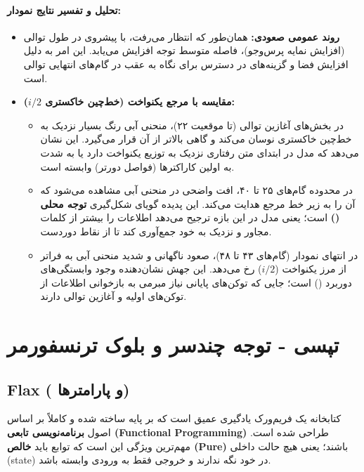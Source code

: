 \documentclass{article}
\begin{document}
\paragraph{تحلیل و تفسیر نتایج نمودار:}
\begin{itemize}
	\item \textbf{روند عمومی صعودی:} همان‌طور که انتظار می‌رفت، با پیشروی در طول توالی (افزایش نمایه پرس‌وجو)، فاصله متوسط توجه افزایش می‌یابد. این امر به دلیل افزایش فضا و گزینه‌های در دسترس برای نگاه به عقب در گام‌های انتهایی توالی است.
	\item \textbf{مقایسه با مرجع یکنواخت (خط‌چین خاکستری $i/2$):}
	\begin{itemize}
		\item در بخش‌های آغازین توالی (تا موقعیت ۲۲)، منحنی آبی رنگ بسیار نزدیک به خط‌چین خاکستری نوسان می‌کند و گاهی بالاتر از آن قرار می‌گیرد. این نشان می‌دهد که مدل در ابتدای متن رفتاری نزدیک به توزیع یکنواخت دارد یا به شدت به اولین کاراکترها (فواصل دورتر) وابسته است.
		\item در محدوده گام‌های ۲۵ تا ۴۰، افت واضحی در منحنی آبی مشاهده می‌شود که آن را به زیر خط مرجع هدایت می‌کند. این پدیده گویای شکل‌گیری \textbf{توجه محلی ()} است؛ یعنی مدل در این بازه ترجیح می‌دهد اطلاعات را بیشتر از کلمات مجاور و نزدیک به خود جمع‌آوری کند تا از نقاط دوردست.
		\item در انتهای نمودار (گام‌های ۴۳ تا ۴۸)، صعود ناگهانی و شدید منحنی آبی به فراتر از مرز یکنواخت ($i/2$) رخ می‌دهد. این جهش نشان‌دهنده وجود وابستگی‌های دوربرد () است؛ جایی که توکن‌های پایانی نیاز مبرمی به بازخوانی اطلاعات از توکن‌های اولیه و آغازین توالی دارند.
	\end{itemize}
\end{itemize}



\section{تپسی - توجه چندسر و بلوک ترنسفورمر}
\subsection{Flax  ( و  پارامترها)}

کتابخانه  یک فریم‌ورک یادگیری عمیق است که بر پایه  ساخته شده و کاملاً بر اساس اصول \textbf{برنامه‌نویسی تابعی (Functional Programming)} طراحی شده است. مهم‌ترین ویژگی  این است که توابع باید \textbf{خالص (Pure)} باشند؛ یعنی هیچ حالت داخلی (state) در خود نگه ندارند و خروجی فقط به ورودی وابسته باشد.
\end{document}
